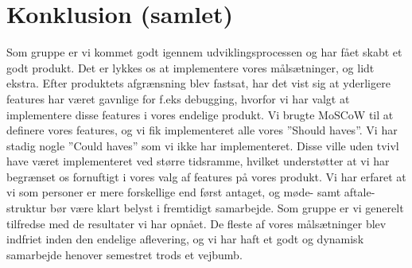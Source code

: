 \chapter{Konklusion (samlet)}

Som gruppe er vi kommet godt igennem udviklingsprocessen og har fået skabt et godt produkt. Det er lykkes os at implementere vores målsætninger, og lidt ekstra. Efter produktets afgrænsning blev fastsat, har det vist sig at yderligere features har været gavnlige for f.eks debugging, hvorfor vi har valgt at implementere disse features i vores endelige produkt. 
Vi brugte MoSCoW til at definere vores features, og vi fik implementeret alle vores ”Should haves”. Vi har stadig nogle ”Could haves” som vi ikke har implementeret. Disse ville uden tvivl have været implementeret ved større tidsramme, hvilket understøtter at vi har begrænset os fornuftigt i vores valg af features på vores produkt. 
Vi har erfaret at vi som personer er mere forskellige end først antaget, og møde- samt aftale-struktur bør være klart belyst i fremtidigt samarbejde. 
Som gruppe er vi generelt tilfredse med de resultater vi har opnået. De fleste af vores målsætninger blev indfriet inden den endelige aflevering, og vi har haft et godt og dynamisk samarbejde henover semestret trods et vejbumb.